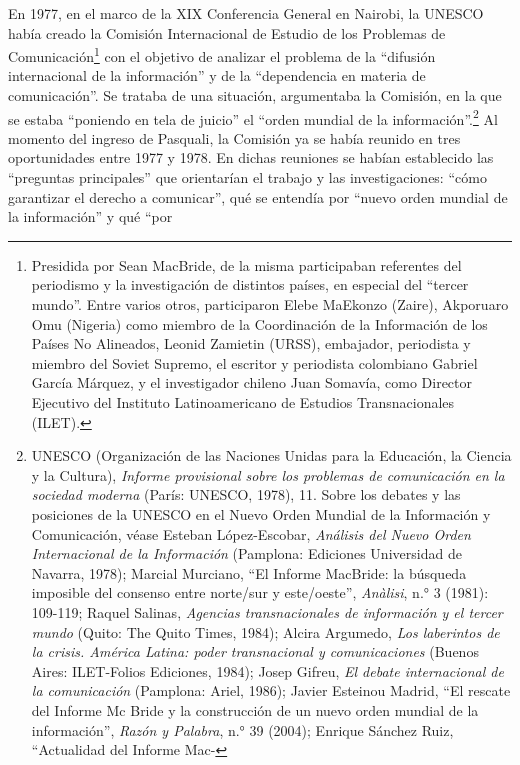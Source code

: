 \documentclass{tufte-handout}
\begin{document}
En 1977, en el marco de la XIX Conferencia General en Nairobi, la UNESCO
había creado la Comisión Internacional de Estudio de los Problemas de
Comunicación\footnote{Presidida por Sean MacBride, de la misma
  participaban referentes del periodismo y la investigación de distintos
  países, en especial del ``tercer mundo''. Entre varios otros,
  participaron Elebe MaEkonzo (Zaire), Akporuaro Omu (Nigeria) como
  miembro de la Coordinación de la Información de los Países No
  Alineados, Leonid Zamietin (URSS), embajador, periodista y miembro del
  Soviet Supremo, el escritor y periodista colombiano Gabriel García
  Márquez, y el investigador chileno Juan Somavía, como Director
  Ejecutivo del Instituto Latinoamericano de Estudios Transnacionales
  (ILET).} con el objetivo de analizar el problema de la ``difusión
internacional de la información'' y de la ``dependencia en materia de
comunicación''. Se trataba de una situación, argumentaba la Comisión, en
la que se estaba ``poniendo en tela de juicio'' el ``orden mundial de la
información''.\footnote{UNESCO (Organización de las Naciones Unidas para
  la Educación, la Ciencia y la Cultura), \emph{Informe provisional
  sobre los problemas de comunicación en la sociedad moderna} (París:
  UNESCO, 1978), 11. Sobre los debates y las posiciones de la UNESCO en
  el Nuevo Orden Mundial de la Información y Comunicación, véase Esteban
  López-Escobar, \emph{Análisis del Nuevo Orden Internacional de la
  Información} (Pamplona: Ediciones Universidad de Navarra, 1978);
  Marcial Murciano, ``El Informe MacBride: la búsqueda imposible del
  consenso entre norte/sur y este/oeste'', \emph{Anàlisi}, n.° 3 (1981):
  109-119; Raquel Salinas, \emph{Agencias transnacionales de información
  y el tercer mundo} (Quito: The Quito Times, 1984); Alcira Argumedo,
  \emph{Los laberintos de la crisis. América Latina: poder transnacional
  y comunicaciones} (Buenos Aires: ILET-Folios Ediciones, 1984); Josep
  Gifreu, \emph{El debate internacional de la comunicación} (Pamplona:
  Ariel, 1986); Javier Esteinou Madrid, ``El rescate del Informe Mc
  Bride y la construcción de un nuevo orden mundial de la información'',
  \emph{Razón y Palabra}, n.° 39 (2004); Enrique Sánchez Ruiz,
  ``Actualidad del Informe Mac-} Al momento del
ingreso de Pasquali, la Comisión ya se había reunido en tres
oportunidades entre 1977 y 1978. En dichas reuniones se habían
establecido las ``preguntas principales'' que orientarían el trabajo y
las investigaciones: ``cómo garantizar el derecho a comunicar'', qué se
entendía por ``nuevo orden mundial de la información'' y qué ``por
\end{document}
